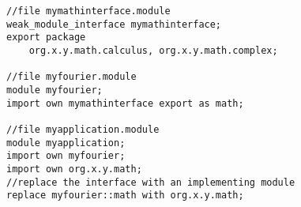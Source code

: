 \begin{lstlisting}[caption=Weak Interfaces]
//file mymathinterface.module
weak_module_interface mymathinterface;
export package 
	org.x.y.math.calculus, org.x.y.math.complex;

//file myfourier.module
module myfourier;
import own mymathinterface export as math;

//file myapplication.module
module myapplication;
import own myfourier;
import own org.x.y.math;
//replace the interface with an implementing module
replace myfourier::math with org.x.y.math;
\end{lstlisting}

%









